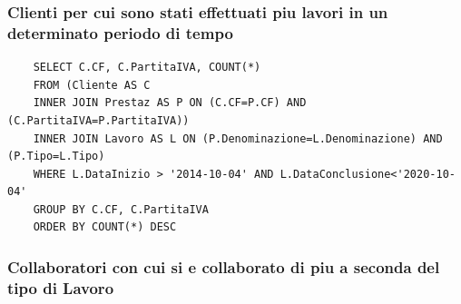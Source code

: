 \documentclass{elegantbook}
\begin{document}
\subsubsection{Clienti per cui sono stati effettuati piu lavori in un determinato periodo di tempo}
\begin{verbatim}
	SELECT C.CF, C.PartitaIVA, COUNT(*) 
	FROM (Cliente AS C 
	INNER JOIN Prestaz AS P ON (C.CF=P.CF) AND (C.PartitaIVA=P.PartitaIVA))
	INNER JOIN Lavoro AS L ON (P.Denominazione=L.Denominazione) AND (P.Tipo=L.Tipo)
	WHERE L.DataInizio > '2014-10-04' AND L.DataConclusione<'2020-10-04'
	GROUP BY C.CF, C.PartitaIVA
	ORDER BY COUNT(*) DESC
\end{verbatim}
\begin{figure}[H]
	\centering
\end{figure}
\subsubsection{Collaboratori con cui si e collaborato di piu a seconda del tipo di Lavoro}
\end{document}
